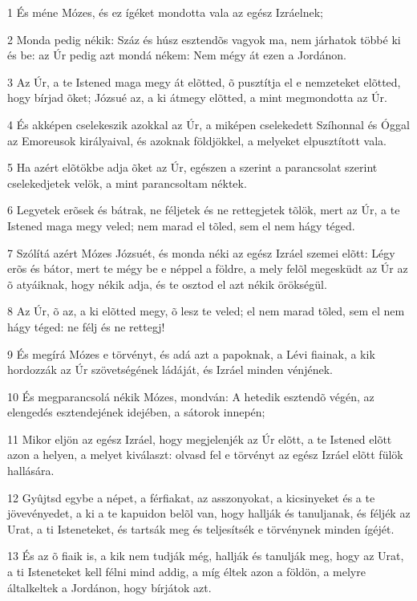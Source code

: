 \par 1 És méne Mózes, és ez ígéket mondotta vala az egész Izráelnek;
\par 2 Monda pedig nékik: Száz és húsz esztendõs vagyok ma, nem járhatok többé ki és be: az Úr pedig azt mondá nékem: Nem mégy át ezen a Jordánon.
\par 3 Az Úr, a te Istened maga megy át elõtted, õ pusztítja el e nemzeteket elõtted, hogy bírjad õket; Józsué az, a ki átmegy elõtted, a mint megmondotta az Úr.
\par 4 És akképen cselekeszik azokkal az Úr, a miképen cselekedett Szíhonnal és Óggal az Emoreusok királyaival, és azoknak földjökkel, a melyeket elpusztított vala.
\par 5 Ha azért elõtökbe adja õket az Úr, egészen a szerint a parancsolat szerint cselekedjetek velök, a mint parancsoltam néktek.
\par 6 Legyetek erõsek és bátrak, ne féljetek és ne rettegjetek tõlök, mert az Úr, a te Istened maga megy veled; nem  marad el tõled, sem el nem hágy téged.
\par 7 Szólítá azért Mózes Józsuét, és monda néki az egész Izráel szemei elõtt: Légy erõs és bátor, mert te mégy be e néppel a földre, a mely felõl megesküdt az Úr az õ atyáiknak, hogy nékik adja, és te osztod el azt nékik örökségül.
\par 8 Az Úr, õ az, a ki elõtted megy, õ lesz te veled; el nem marad tõled, sem el nem hágy téged: ne félj és ne rettegj!
\par 9 És megírá Mózes e törvényt, és adá azt a papoknak, a Lévi fiainak, a kik hordozzák az Úr szövetségének ládáját, és Izráel minden vénjének.
\par 10 És megparancsolá nékik Mózes, mondván: A hetedik esztendõ végén, az elengedés esztendejének idejében, a sátorok innepén;
\par 11 Mikor eljön az egész Izráel, hogy megjelenjék az Úr elõtt, a te Istened elõtt azon a helyen, a melyet kiválaszt: olvasd fel e törvényt az egész Izráel elõtt fülök hallására.
\par 12 Gyûjtsd egybe a népet, a férfiakat, az asszonyokat, a kicsinyeket és a te jövevényedet, a ki a te kapuidon belõl van, hogy hallják és tanuljanak, és féljék az Urat, a ti Isteneteket, és tartsák meg és teljesítsék e törvénynek minden ígéjét.
\par 13 És az õ fiaik is, a kik nem tudják még, hallják és tanulják meg, hogy az Urat, a ti Isteneteket kell félni mind addig, a míg éltek azon a földön, a melyre általkeltek a Jordánon, hogy bírjátok azt.
